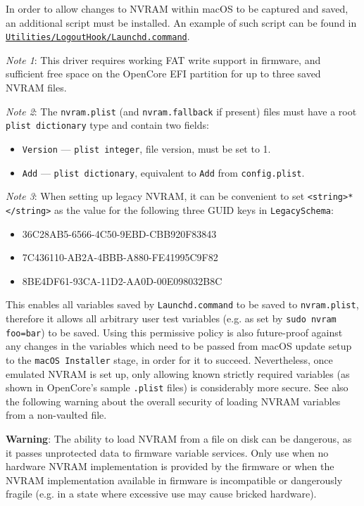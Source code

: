 \documentclass[]{article}
\providecommand{\tightlist}{%
  \setlength{\itemsep}{0pt}\setlength{\parskip}{0pt}}
\begin{document}
In order to allow changes to NVRAM within macOS to be captured and saved,
an additional script must be installed. An example of such script can be found in
\href{https://github.com/acidanthera/OpenCorePkg/tree/master/Utilities/LogoutHook/Launchd.command}{\texttt{Utilities/LogoutHook/Launchd.command}}.

\emph{Note 1}: This driver requires working FAT write support in firmware, and sufficient free
space on the OpenCore EFI partition for up to three saved NVRAM files.

\emph{Note 2}: The \texttt{nvram.plist} (and \texttt{nvram.fallback} if present) files must have a
root \texttt{plist\ dictionary} type and contain two fields:
\begin{itemize}
\tightlist
 \item \texttt{Version} --- \texttt{plist\ integer}, file version, must be set to 1.
 \item \texttt{Add} --- \texttt{plist\ dictionary}, equivalent to \texttt{Add} from
 \texttt{config.plist}.
\end{itemize}

\emph{Note 3}: When setting up legacy NVRAM, it can be convenient to set \texttt{<string>*</string>}
as the value for the following three GUID keys in \texttt{LegacySchema}:
\begin{itemize}
\tightlist
 \item 36C28AB5-6566-4C50-9EBD-CBB920F83843
 \item 7C436110-AB2A-4BBB-A880-FE41995C9F82
 \item 8BE4DF61-93CA-11D2-AA0D-00E098032B8C
\end{itemize}
This enables all variables saved by \texttt{Launchd.command} to be saved to \texttt{nvram.plist},
therefore it allows all arbitrary user test variables (e.g. as set by \texttt{sudo nvram foo=bar})
to be saved. Using this permissive policy is also future-proof against any changes in the variables
which need to be passed from macOS update setup to the \texttt{macOS Installer} stage, in order for
it to succeed.
Nevertheless, once emulated NVRAM is set up, only allowing known strictly required variables
(as shown in OpenCore's sample \texttt{.plist} files) is considerably more secure. See also the
following warning about the overall security of loading NVRAM variables from a non-vaulted file.

\textbf{Warning}: The ability to load NVRAM from a file on disk can be dangerous, as it
passes unprotected data to firmware variable services. Only use when no hardware NVRAM
implementation is provided by the firmware or when the NVRAM implementation available in
firmware is incompatible or dangerously fragile (e.g. in a state where excessive use
may cause bricked hardware).
\end{document}

